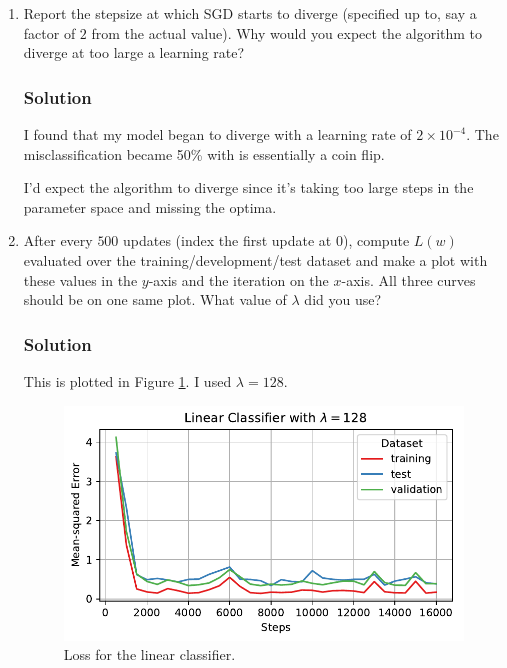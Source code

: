 \documentclass[letterpaper,11pt]{article}
\begin{document}
\begin{enumerate}
\item Report the stepsize at which SGD starts to diverge (specified up to, say a
  factor of $2$ from the actual value). Why would you expect the algorithm to
  diverge at too large a learning rate?

  \subsubsection*{Solution}

  I found that my model began to diverge with a learning rate of
  $2 \times 10^{-4}$. The misclassification became 50\% with is essentially a
  coin flip.

  I'd expect the algorithm to diverge since it's taking too large steps in the
  parameter space and missing the optima.
  
\item After every $500$ updates (index the first update at $0$), compute $L(w)$
  evaluated over the training/development/test dataset and make a plot with
  these values in the $y$-axis and the iteration on the $x$-axis. All three
  curves should be on one same plot. What value of $\lambda$ did you use?

  \subsubsection*{Solution}

  This is plotted in Figure \ref{fig:linear_loss}. I used $\lambda = 128$.

  \begin{figure}
    \centering
    \includegraphics{problem6/linear_loss.pdf}
    \caption{Loss for the linear classifier.}
    \label{fig:linear_loss}
  \end{figure}
  

\end{enumerate}
\end{document}
